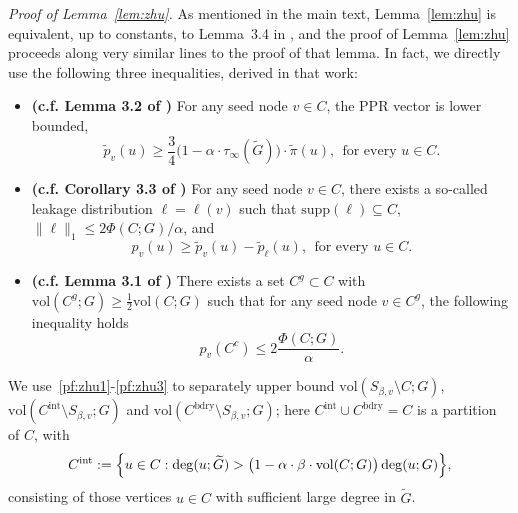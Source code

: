 \documentclass[twoside,11pt]{article}
\newcommand{\1}{\mathbf{1}}
\newcommand{\wt}[1]{\widetilde{#1}}
\newcommand{\vol}{\mathrm{vol}}
\begin{document}
\emph{Proof of Lemma~\ref{lem:zhu}.}
As mentioned in the main text, Lemma~\ref{lem:zhu} is equivalent, up to constants, to Lemma~3.4 in \cite{zhu2013}, and the proof of Lemma~\ref{lem:zhu} proceeds along very similar lines to the proof of that lemma. In fact, we directly use the following three inequalities, derived in that work:
\begin{itemize}
	\item \textbf{(c.f. Lemma 3.2 of \cite{zhu2013})} For any seed node $v \in C$, the PPR vector is lower bounded,
	\begin{equation}
	\label{pf:zhu1}
	\wt{p}_v(u) \geq \frac{3}{4}\bigl(1 - \alpha \cdot \tau_{\infty}(\wt{G})\bigr) \cdot \wt{\pi}(u),~~\textrm{for every $u \in C$.}
	\end{equation}
	\item \textbf{(c.f. Corollary 3.3 of \cite{zhu2013})} For any seed node $v \in C$, there exists a so-called leakage distribution $\ell = \ell(v)$ such that $\mathrm{supp}(\ell) \subseteq C$, $\|\ell\|_1 \leq 2\Phi(C;G)/\alpha$, and 
	\begin{equation}
	\label{pf:zhu2}
	p_v(u) \geq \wt{p}_v(u) - \wt{p}_{\ell}(u),~~\textrm{for every $u \in C$.}
	\end{equation}
	\item \textbf{(c.f. Lemma 3.1 of \cite{zhu2013})} There exists a set $C^g \subset C$ with $\vol(C^g;G) \geq \frac{1}{2}\vol(C;G)$ such that for any seed node $v \in C^g$, the following inequality holds
	\begin{equation}
	\label{pf:zhu3}
	p_v(C^c) \leq 2\frac{\Phi(C;G)}{\alpha}.
	\end{equation}
\end{itemize}
We use~\eqref{pf:zhu1}-\eqref{pf:zhu3} to separately upper bound $\vol(S_{\beta,v} \setminus C;G)$, $\vol(C^{\mathrm{int}} \setminus S_{\beta,v};G)$ and $\vol(C^{\mathrm{bdry}} \setminus S_{\beta,v};G)$; here $C^{\mathrm{int}} \cup C^{\mathrm{bdry}} = C$ is a partition of $C$, with
\begin{equation*}
C^{\mathrm{int}} := \Bigl\{u \in C: \deg(u;\wt{G}) > \bigl(1 - \alpha \cdot \beta \cdot \vol(C;G)\bigr) \deg(u;G) \Bigr\},
\end{equation*}
consisting of those vertices $u \in C$ with sufficient large degree in $\wt{G}$. 
\end{document}
